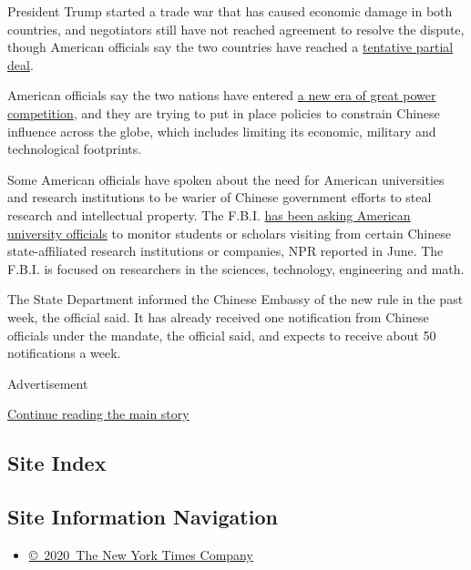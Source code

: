 President Trump started a trade war that has caused economic damage in
both countries, and negotiators still have not reached agreement to
resolve the dispute, though American officials say the two countries
have reached a
\href{https://www.nytimes3xbfgragh.onion/2019/10/15/business/economy/china-trade-deal.html}{tentative
partial deal}.

American officials say the two nations have entered
\href{https://www.nytimes3xbfgragh.onion/2019/06/26/world/asia/united-states-china-conflict.html}{a
new era of great power competition}, and they are trying to put in place
policies to constrain Chinese influence across the globe, which includes
limiting its economic, military and technological footprints.

Some American officials have spoken about the need for American
universities and research institutions to be warier of Chinese
government efforts to steal research and intellectual property. The
F.B.I.
\href{https://www.npr.org/2019/06/28/728659124/fbi-urges-universities-to-monitor-some-chinese-students-and-scholars-in-the-u-s}{has
been asking American university officials} to monitor students or
scholars visiting from certain Chinese state-affiliated research
institutions or companies, NPR reported in June. The F.B.I. is focused
on researchers in the sciences, technology, engineering and math.

The State Department informed the Chinese Embassy of the new rule in the
past week, the official said. It has already received one notification
from Chinese officials under the mandate, the official said, and expects
to receive about 50 notifications a week.

Advertisement

\protect\hyperlink{after-bottom}{Continue reading the main story}

\hypertarget{site-index}{%
\subsection{Site Index}\label{site-index}}

\hypertarget{site-information-navigation}{%
\subsection{Site Information
Navigation}\label{site-information-navigation}}

\begin{itemize}
\tightlist
\item
  \href{https://help.nytimes3xbfgragh.onion/hc/en-us/articles/115014792127-Copyright-notice}{©~2020~The
  New York Times Company}
\end{itemize}

